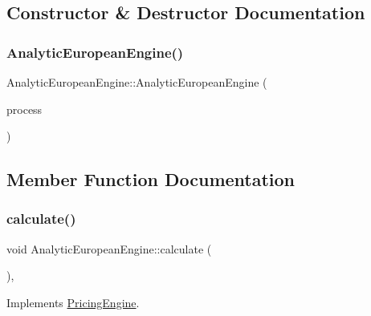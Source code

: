 \subsection{Constructor \& Destructor Documentation}
\hypertarget{class_analytic_european_engine_ae29c59f14976eaa910d4773d11aa234f}{}\label{class_analytic_european_engine_ae29c59f14976eaa910d4773d11aa234f} 
\subsubsection{\texorpdfstring{Analytic\+European\+Engine()}{AnalyticEuropeanEngine()}}
{\footnotesize\ttfamily Analytic\+European\+Engine\+::\+Analytic\+European\+Engine (\begin{DoxyParamCaption}\item[{std\+::shared\+\_\+ptr$<$ \hyperlink{class_b_s_stochastic_process}{B\+S\+Stochastic\+Process} $>$}]{process }\end{DoxyParamCaption})}



\subsection{Member Function Documentation}
\hypertarget{class_analytic_european_engine_adeda22c7b482779d7deaa17037195487}{}\label{class_analytic_european_engine_adeda22c7b482779d7deaa17037195487} 
\subsubsection{\texorpdfstring{calculate()}{calculate()}}
{\footnotesize\ttfamily void Analytic\+European\+Engine\+::calculate (\begin{DoxyParamCaption}{ }\end{DoxyParamCaption})\hspace{0.3cm}{\ttfamily [override]}, {\ttfamily [virtual]}}



Implements \hyperlink{class_pricing_engine_a733511ffc3cf5e4dc1fbc2a39208d8bd}{Pricing\+Engine}.



